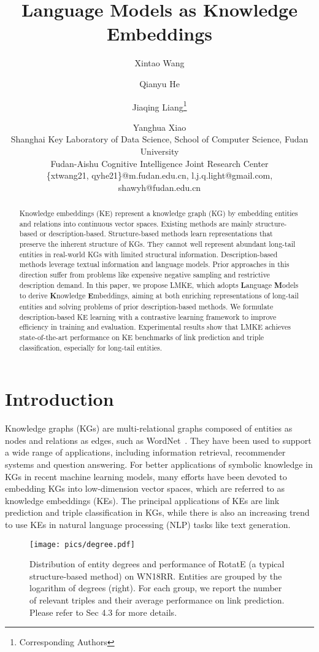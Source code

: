 \documentclass{article}
\title{Language Models as Knowledge Embeddings}
\author{
Xintao Wang\and
Qianyu He\and
Jiaqing Liang\footnote{Corresponding Authors}\and
Yanghua Xiao\\
\affiliations
Shanghai Key Laboratory of Data Science, School of Computer Science, Fudan University\\
Fudan-Aishu Cognitive Intelligence Joint Research Center\\
\emails
\{xtwang21, qyhe21\}@m.fudan.edu.cn,
l.j.q.light@gmail.com,
shawyh@fudan.edu.cn
}
\begin{document}
\maketitle

\begin{abstract}
Knowledge embeddings (KE) represent a knowledge graph (KG) by embedding entities and relations into continuous vector spaces.
Existing methods are mainly structure-based or description-based. 
Structure-based methods learn representations that preserve the inherent structure of KGs. 
They cannot well represent abundant long-tail entities in real-world KGs with limited structural information.
Description-based methods leverage textual information and language models. 
Prior approaches in this direction suffer from problems like expensive negative sampling and restrictive description demand.
In this paper, we propose LMKE, which adopts 
\textbf{L}anguage \textbf{M}odels to derive \textbf{K}nowledge \textbf{E}mbeddings, aiming at both enriching representations of long-tail entities and solving problems of prior description-based methods.
We formulate description-based KE learning with a contrastive learning framework to improve efficiency in  training and evaluation.
Experimental results show that LMKE achieves state-of-the-art performance on KE benchmarks of link prediction and triple classification, especially for long-tail entities.



\end{abstract}

\section{Introduction}

Knowledge graphs (KGs) are multi-relational graphs composed of entities as nodes and relations as edges, such as WordNet~\cite{miller1995wordnet}. They have been used to support a wide range of applications, including information retrieval, recommender systems and question answering. 
For better applications of symbolic knowledge in KGs in recent machine learning models, 
many efforts have been devoted to embedding KGs into low-dimension vector spaces, which are referred to as knowledge embeddings (KEs).
The principal applications of KEs are link prediction and triple classification in KGs, while there is also an increasing trend to use KEs in natural language processing (NLP) tasks like text generation.

\begin{figure}[t]
    \centering
        \texttt{[image: pics/degree.pdf]}
    \caption{
    Distribution of entity degrees and performance of RotatE (a typical structure-based method) on WN18RR. Entities are grouped by the logarithm of degrees (right). For each group, we report the number of relevant triples and their average performance on link prediction. Please refer to Sec 4.3 for more details.}
    \label{fig:long-tail}
\end{figure}
\end{document}
